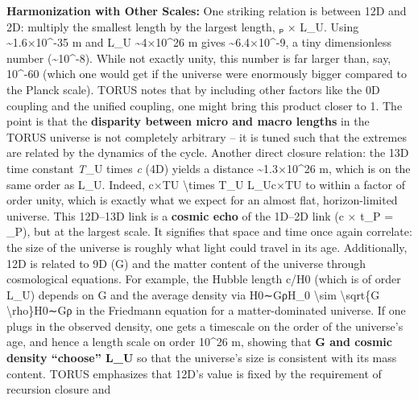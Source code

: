 \documentclass[
]{article}
\begin{document}
{\textbf{Harmonization with Other Scales:} One striking relation is
between 12D and 2D: multiply the smallest length by the largest length,
\emph{\ell}ₚ × L\_U. Using  \textasciitilde1.6×10\^{}-35 m and L\_U
\textasciitilde4×10\^{}26 m gives \textasciitilde6.4×10\^{}-9, a tiny
dimensionless number (\textasciitilde10\^{}-8)\hspace{0pt}. While not
exactly unity, this number is far larger than, say, 10\^{}-60 (which one
would get if the universe were enormously bigger compared to the Planck
scale). TORUS notes that by including other factors like the 0D coupling
and the unified coupling, one might bring this product closer to
1\hspace{0pt}. The point is that the \textbf{disparity between micro and
macro lengths} in the TORUS universe is not completely arbitrary -- it
is tuned such that the extremes are related by the dynamics of the
cycle\hspace{0pt}. Another direct closure relation: the 13D time
constant \emph{T}_{U}{}
times \emph{c} (4D) yields a distance \textasciitilde1.3×10\^{}26 m,
which is on the same order as L\_U\hspace{0pt}. Indeed, c×TU\approxLUc
\textbackslash times T\_U \approx L\_Uc×TU\hspace{0pt}\approxLU\hspace{0pt} to
within a factor of order unity, which is exactly what we expect for an
almost flat, horizon-limited universe. This 12D--13D link is a
\textbf{cosmic echo} of the 1D--2D link (c × t\_P = \ell\_P), but at the
largest scale\hspace{0pt}. It signifies that space and time once again
correlate: the size of the universe is roughly what light could travel
in its age. Additionally, 12D is related to 9D (G) and the matter
content of the universe through cosmological equations. For example, the
Hubble length c/H0 (which is of order L\_U) depends on G and the average
density via H0∼GρH\_0 \textbackslash sim \textbackslash sqrt\{G
\textbackslash rho\}H0\hspace{0pt}∼Gρ\hspace{0pt} in the Friedmann
equation for a matter-dominated universe\hspace{0pt}. If one plugs in
the observed density, one gets a timescale on the order of the
universe's age, and hence a length scale on order 10\^{}26 m, showing
that \textbf{G and cosmic density ``choose'' L\_U} so that the
universe's size is consistent with its mass content. TORUS emphasizes
that 12D's value is fixed by the requirement of recursion closure and
}
\end{document}

